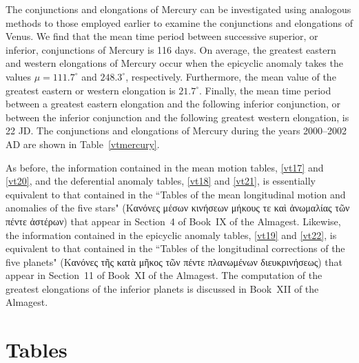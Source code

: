The conjunctions  and elongations of Mercury can be investigated
using analogous methods to those employed earlier to examine the
conjunctions and elongations of Venus. We find that the mean
time period between successive superior, or inferior, conjunctions of
Mercury is 116 days. On average, the greatest eastern and
western elongations of Mercury occur when the epicyclic anomaly takes the
values $\mu=111.7^\circ$ and $248.3^\circ$, respectively. Furthermore,
the mean value of the greatest eastern or western elongation is $21.7^\circ$.
 Finally,
the mean time period between a greatest eastern elongation  and the following
inferior conjunction, or between the inferior conjunction and the following greatest western elongation, is 22 JD. The conjunctions and elongations of Mercury
during the years 2000--2002 AD are shown in Table~\ref{vtmercury}.

As before, the information contained in the mean motion tables, \ref{vt17}  and \ref{vt20}, and the deferential anomaly tables, \ref{vt18} and \ref{vt21}, is essentially equivalent to that contained in the  ``Tables of the mean longitudinal motion and anomalies of the five stars" (Κανόνες μέσων κινήσεων μήκους τε καὶ ἀνωμαλίας τῶν πέντε ἀστέρων)
that appear in Section~4 of Book~IX of the Almagest. Likewise, the information contained in the epicyclic anomaly tables, \ref{vt19}  and \ref{vt22}, is equivalent
to that contained in the ``Tables of the longitudinal corrections of the five planets" (Κανόνες τῆς κατὰ μῆκος τῶν πέντε πλανωμένων διευκρινήσεως)  that appear in Section~11 of Book~XI of the Almagest. The computation of the greatest elongations of the inferior planets is
discussed in Book~XII of the Almagest. 

\clearpage
\section{Tables}


